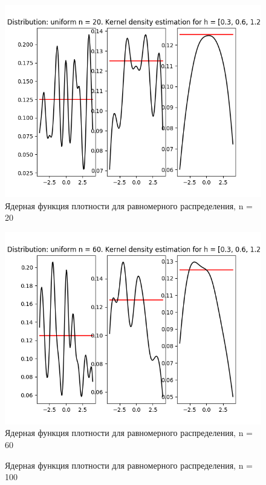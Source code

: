 \documentclass[12pt]{report}
\begin{document}
\begin{center}
    \begin{figure}[H]
 \caption{Ядерная функция плотности для равномерного распределения, n = 20}
\includegraphics[width=\textwidth]{../lab_4/pic/kernel/d_uniform20.png}
\end{figure}
    \begin{figure}[H]
 \caption{Ядерная функция плотности для равномерного распределения, n = 60}
\includegraphics[width=\textwidth]{../lab_4/pic/kernel/d_uniform60.png}
\end{figure}
    \begin{figure}[H]
 \caption{Ядерная функция плотности для равномерного распределения, n = 100}

\end{figure}
\end{center}
\end{document}
